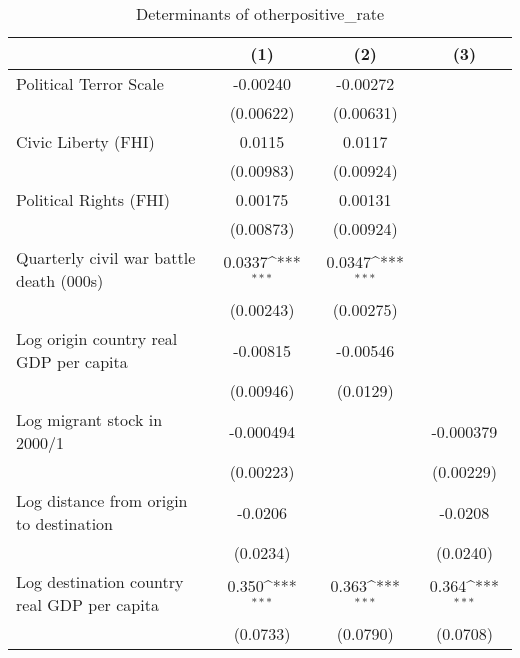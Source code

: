 \begin{table}[htbp]\centering
\def\sym#1{\ifmmode^{#1}\else\(^{#1}\)\fi}
\caption{Determinants of otherpositive\_rate}
\begin{tabular}{l*{3}{c}}
\hline\hline
                    &\multicolumn{1}{c}{(1)}         &\multicolumn{1}{c}{(2)}         &\multicolumn{1}{c}{(3)}         \\
\hline
Political Terror Scale&    -0.00240         &    -0.00272         &                     \\
                    &   (0.00622)         &   (0.00631)         &                     \\
[1em]
Civic Liberty (FHI) &      0.0115         &      0.0117         &                     \\
                    &   (0.00983)         &   (0.00924)         &                     \\
[1em]
Political Rights (FHI)&     0.00175         &     0.00131         &                     \\
                    &   (0.00873)         &   (0.00924)         &                     \\
[1em]
Quarterly civil war battle death (000s)&      0.0337\sym{***}&      0.0347\sym{***}&                     \\
                    &   (0.00243)         &   (0.00275)         &                     \\
[1em]
Log origin country real GDP per capita&    -0.00815         &    -0.00546         &                     \\
                    &   (0.00946)         &    (0.0129)         &                     \\
[1em]
Log migrant stock in 2000/1&   -0.000494         &                     &   -0.000379         \\
                    &   (0.00223)         &                     &   (0.00229)         \\
[1em]
Log distance from origin to destination&     -0.0206         &                     &     -0.0208         \\
                    &    (0.0234)         &                     &    (0.0240)         \\
[1em]
Log destination country real GDP per capita&       0.350\sym{***}&       0.363\sym{***}&       0.364\sym{***}\\
                    &    (0.0733)         &    (0.0790)         &    (0.0708)         \\

\end{tabular}
\end{table}
